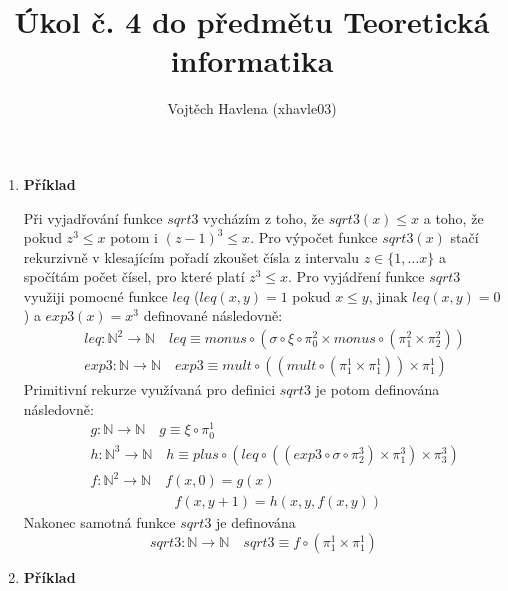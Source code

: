 \documentclass[a4paper,12pt]{article}
\title{Úkol č. 4 do předmětu Teoretická informatika}
\author{Vojtěch Havlena (xhavle03)}
\date{}
\begin{document}
\maketitle


\begin{enumerate}[label=\textbf{\arabic*}.]

 \item {\bfseries Příklad}
 
 Při vyjadřování funkce $sqrt3$ vycházím z toho, že $sqrt3(x) \leq x$ a toho, že pokud
 $z^3 \leq x$ potom i $(z - 1)^3 \leq x$. Pro výpočet funkce $sqrt3(x)$ stačí rekurzivně
 v klesajícím pořadí zkoušet čísla z intervalu $z \in\{1, \dots x\}$ a spočítám počet čísel, pro které platí $z^3 \leq x$.
 Pro vyjádření funkce $sqrt3$ využiji pomocné funkce $leq$ ($leq(x,y) = 1$ pokud $x\leq y$, jinak $leq(x,y) = 0$) a 
 $exp3(x) = x^3$ definované následovně:
 \begin{eqnarray*}
   &&leq: \mathbb{N}^2 \rightarrow \mathbb{N}\quad leq \equiv monus\circ(\sigma\circ\xi\circ\pi^2_0 \times monus\circ(\pi^2_1\times \pi^2_2))\\
   &&exp3: \mathbb{N} \rightarrow \mathbb{N}\quad exp3 \equiv mult\circ((mult\circ (\pi^1_1\times \pi^1_1))\times \pi^1_1)
 \end{eqnarray*}
 Primitivní rekurze využívaná pro definici $sqrt3$ je potom definována následovně:
 \begin{eqnarray*}
  &&g: \mathbb{N} \rightarrow \mathbb{N}\quad g \equiv \xi\circ\pi^1_0\\
  &&h: \mathbb{N}^3 \rightarrow \mathbb{N}\quad h\equiv plus\circ(leq\circ((exp3\circ\sigma\circ\pi^3_2)\times\pi^3_1)\times\pi^3_3)\\
  &&f: \mathbb{N}^2 \rightarrow \mathbb{N}\quad f(x,0) = g(x)\\
  && \quad\quad\quad\quad\quad\quad f(x, y+1) = h(x,y,f(x,y))
 \end{eqnarray*}
 Nakonec samotná funkce $sqrt3$ je definována
 $$
  sqrt3: \mathbb{N} \rightarrow \mathbb{N}\quad sqrt3 \equiv f\circ(\pi^1_1\times \pi^1_1)
 $$

 \item {\bfseries Příklad}
 

\end{enumerate}
\end{document}
